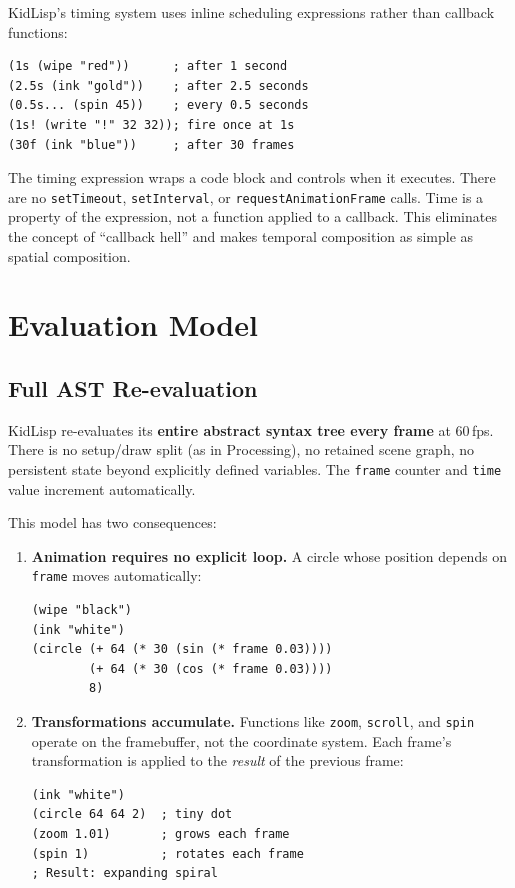 \documentclass[sigconf,nonacm]{acmart}
\begin{document}
KidLisp's timing system uses inline scheduling expressions rather than callback functions:

\begin{lstlisting}
(1s (wipe "red"))      ; after 1 second
(2.5s (ink "gold"))    ; after 2.5 seconds
(0.5s... (spin 45))    ; every 0.5 seconds
(1s! (write "!" 32 32)); fire once at 1s
(30f (ink "blue"))     ; after 30 frames
\end{lstlisting}

The timing expression wraps a code block and controls when it executes. There are no \texttt{setTimeout}, \texttt{setInterval}, or \texttt{requestAnimationFrame} calls. Time is a property of the expression, not a function applied to a callback. This eliminates the concept of ``callback hell'' and makes temporal composition as simple as spatial composition.

\section{Evaluation Model}
\label{sec:evaluation}

\subsection{Full AST Re-evaluation}

KidLisp re-evaluates its \textbf{entire abstract syntax tree every frame} at 60\,fps. There is no setup/draw split (as in Processing), no retained scene graph, no persistent state beyond explicitly defined variables. The \texttt{frame} counter and \texttt{time} value increment automatically.

This model has two consequences:

\begin{enumerate}
  \item \textbf{Animation requires no explicit loop.} A circle whose position depends on \texttt{frame} moves automatically:
\begin{lstlisting}
(wipe "black")
(ink "white")
(circle (+ 64 (* 30 (sin (* frame 0.03))))
        (+ 64 (* 30 (cos (* frame 0.03))))
        8)
\end{lstlisting}

  \item \textbf{Transformations accumulate.} Functions like \texttt{zoom}, \texttt{scroll}, and \texttt{spin} operate on the framebuffer, not the coordinate system. Each frame's transformation is applied to the \emph{result} of the previous frame:
\begin{lstlisting}
(ink "white")
(circle 64 64 2)  ; tiny dot
(zoom 1.01)       ; grows each frame
(spin 1)          ; rotates each frame
; Result: expanding spiral
\end{lstlisting}
\end{enumerate}
\end{document}
